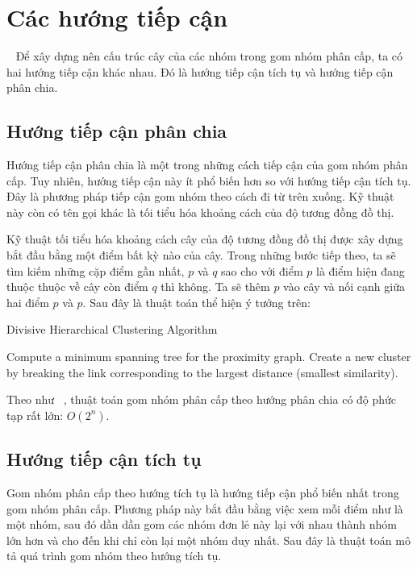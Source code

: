 \section{Các hướng tiếp cận}
~\cite{Vipin-Kumar, hierarchical-clustering} Để xây dựng nên cấu trúc cây của các nhóm trong gom nhóm phân cấp, ta có hai hướng tiếp cận khác nhau. Đó là hướng tiếp cận tích tụ và hướng tiếp cận phân chia.

\subsection{Hướng tiếp cận phân chia}
Hướng tiếp cận phân chia là một trong những cách tiếp cận của gom nhóm phân cấp.
Tuy nhiên, hướng tiếp cận này ít phổ biến hơn so với hướng tiếp cận tích tụ.
Đây là phương pháp tiếp cận gom nhóm theo cách đi từ trên xuống.
Kỹ thuật này còn có tên gọi khác là tối tiểu hóa khoảng cách của độ tương đồng đồ thị.

Kỹ thuật tối tiểu hóa khoảng cách cây của độ tương đồng đồ thị được xây dựng bắt đầu bằng một điểm bất kỳ nào của cây.
Trong những bước tiếp theo, ta sẽ tìm kiếm những cặp điểm gần nhất, $p$ và $q$ sao cho với điểm $p$ là điểm hiện đang thuộc thuộc về cây còn điểm $q$ thì không.
Ta sẽ thêm $p$ vào cây và nối cạnh giữa hai điểm $p$ và $p$.
Sau đây là thuật toán thể hiện ý tưởng trên:

\begin{algorithm}
\caption{Divisive Hierarchical Clustering Algorithm}
\label{alg:Divisive}
\begin{algorithmic}[1]
\State Compute a minimum spanning tree for the proximity graph.
\Repeat
\State Create a new cluster by breaking the link corresponding to the largest distance (smallest similarity).
\end{algorithmic}
\end{algorithm}

Theo như ~\cite{wiki-HAC}, thuật toán gom nhóm phân cấp theo hướng phân chia có độ phức tạp rất lớn: $O(2^n)$.

		
		
\subsection{Hướng tiếp cận tích tụ}
Gom nhóm phân cấp theo hướng tích tụ là hướng tiếp cận phổ biến nhất trong gom nhóm phân cấp.
Phương pháp này bắt đầu bằng việc xem mỗi điểm như là một nhóm, sau đó dần dần gom các nhóm đơn lẻ này lại với nhau thành nhóm lớn hơn và cho đến khi chỉ còn lại một nhóm duy nhất.
Sau đây là thuật toán mô tả quá trình gom nhóm theo hướng tích tụ.

